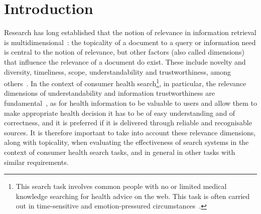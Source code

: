 \section{Introduction}
\label{chp:evaluation_metrics}


Research has long established that the notion of relevance in information retrieval is multidimensional~\cite{schamber94,borlund03}: the topicality of a document to a query or information need is central to the notion of relevance, but other factors (also called dimensions) that influence the relevance of a document do exist. These include novelty and diversity, timeliness, scope, understandability and trustworthiness, among others~\cite{park93,schamber94}. In the context of consumer health search\footnote{This search task involves common people with no or limited medical knowledge searching for health advice on the web. This task is often carried out in time-sensitive and emotion-pressured circumstances~\cite{hersh08,mishra2014time}.}, in particular, the relevance dimensions of understandability and information trustworthiness are fundamental~\cite{hersh08}, as for health information to be valuable to users and allow them to make appropriate health decision it has to be of easy understanding and of correctness, and it is preferred if it is delivered through reliable and recognisable sources. It is therefore important to take into account these relevance dimensions, along with topicality, when evaluating the effectiveness of search systems in the context of consumer health search tasks, and in general in other tasks with similar requirements.

